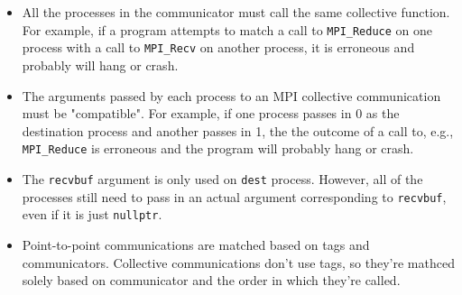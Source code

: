\begin{itemize}
    \item All the processes in the communicator must call the same collective function.
    For example, if a program attempts to match a call to \texttt{MPI\_Reduce} on one process
    with a call to \texttt{MPI\_Recv} on another process, it is erroneous and probably will
    hang or crash.

    \item The arguments passed by each process to an MPI collective communication must be
    "compatible". For example, if one process passes in 0 as the destination process and 
    another passes in 1, the the outcome of a call to, e.g., \texttt{MPI\_Reduce} is erroneous
    and the program will probably hang or crash.

    \item The \texttt{recvbuf} argument is only used on \texttt{dest} process. 
    However, all of the processes still need to pass in an actual argument corresponding to
    \texttt{recvbuf}, even if it is just \texttt{nullptr}.

    \item Point-to-point communications are matched based on tags and communicators. Collective
    communications don't use tags, so they're mathced solely based on communicator and the 
    order in which they're called.
\end{itemize}





